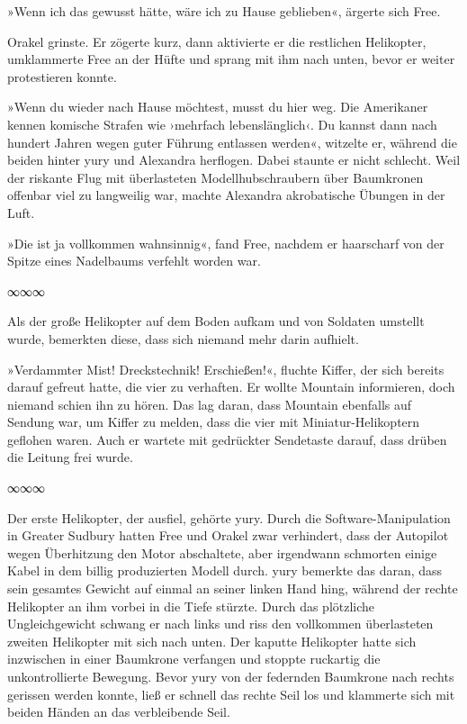 »Wenn ich das gewusst hätte, wäre ich zu Hause geblieben«, ärgerte sich Free.

Orakel grinste. Er zögerte kurz, dann aktivierte er die restlichen Helikopter, umklammerte Free an der Hüfte und sprang mit ihm nach unten, bevor er weiter protestieren konnte.

»Wenn du wieder nach Hause möchtest, musst du hier weg. Die Amerikaner kennen komische Strafen wie ›mehrfach lebenslänglich‹. Du kannst dann nach hundert Jahren wegen guter Führung entlassen werden«, witzelte er, während die beiden hinter yury und Alexandra herflogen. Dabei staunte er nicht schlecht. Weil der riskante Flug mit überlasteten Modellhubschraubern über Baumkronen offenbar viel zu langweilig war, machte Alexandra akrobatische Übungen in der Luft.

»Die ist ja vollkommen wahnsinnig«, fand Free, nachdem er haarscharf von der Spitze eines Nadelbaums verfehlt worden war.

\begin{center}
    ∞∞∞
\end{center}

Als der große Helikopter auf dem Boden aufkam und von Soldaten umstellt wurde, bemerkten diese, dass sich niemand mehr darin aufhielt.

»Verdammter Mist! Dreckstechnik! Erschießen!«, fluchte Kiffer, der sich bereits darauf gefreut hatte, die vier zu verhaften. Er wollte Mountain informieren, doch niemand schien ihn zu hören. Das lag daran, dass Mountain ebenfalls auf Sendung war, um Kiffer zu melden, dass die vier mit Miniatur-Helikoptern geflohen waren. Auch er wartete mit gedrückter Sendetaste darauf, dass drüben die Leitung frei wurde.

\begin{center}
    ∞∞∞
\end{center}

Der erste Helikopter, der ausfiel, gehörte yury. Durch die Software-Manipulation in Greater Sudbury hatten Free und Orakel zwar verhindert, dass der Autopilot wegen Überhitzung den Motor abschaltete, aber irgendwann schmorten einige Kabel in dem billig produzierten Modell durch. yury bemerkte das daran, dass sein gesamtes Gewicht auf einmal an seiner linken Hand hing, während der rechte Helikopter an ihm vorbei in die Tiefe stürzte. Durch das plötzliche Ungleichgewicht schwang er nach links und riss den vollkommen überlasteten zweiten Helikopter mit sich nach unten. Der kaputte Helikopter hatte sich inzwischen in einer Baumkrone verfangen und stoppte ruckartig die unkontrollierte Bewegung. Bevor yury von der federnden Baumkrone nach rechts gerissen werden konnte, ließ er schnell das rechte Seil los und klammerte sich mit beiden Händen an das verbleibende Seil.

